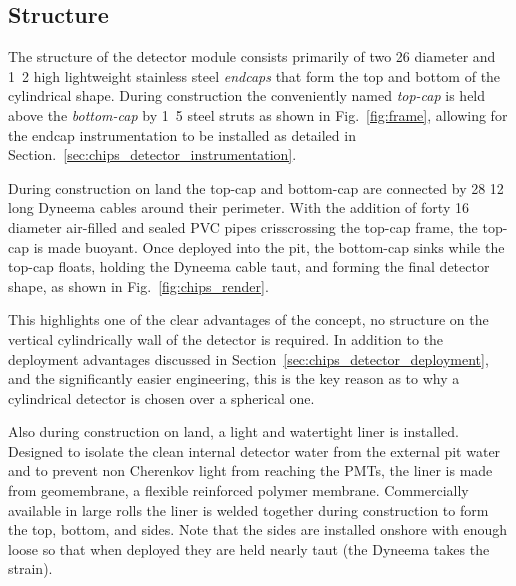 \subsection{Structure} %
\label{sec:chips_detector_structure} %

The structure of the \chipsfive detector module consists primarily of two \unit{26}{}
diameter and \unit{1.2}{} high lightweight stainless steel \emph{endcaps} that form the
top and bottom of the cylindrical shape. During construction the conveniently named \emph{top-cap}
is held above the \emph{bottom-cap} by \unit{1.5}{} steel struts as shown in
Fig.~\ref{fig:frame}, allowing for the endcap instrumentation to be installed as detailed in
Section.~\ref{sec:chips_detector_instrumentation}.

During construction on land the top-cap and bottom-cap are connected by 28 \unit{12}{}
long Dyneema cables around their perimeter. With the addition of forty \unit{16}{}
diameter air-filled and sealed PVC pipes crisscrossing the top-cap frame, the top-cap is made
buoyant. Once deployed into the pit, the bottom-cap sinks while the top-cap floats, holding the
Dyneema cable taut, and forming the final detector shape, as shown in Fig.~\ref{fig:chips_render}.

This highlights one of the clear advantages of the \chips concept, no structure on the vertical
cylindrically wall of the detector is required. In addition to the deployment advantages discussed
in Section~\ref{sec:chips_detector_deployment}, and the significantly easier engineering, this is
the key reason as to why a cylindrical detector is chosen over a spherical one.

Also during construction on land, a light and watertight liner is installed. Designed to isolate
the clean internal detector water from the external pit water and to prevent non Cherenkov light
from reaching the PMTs, the liner is made from geomembrane, a flexible reinforced polymer
membrane. Commercially available in large rolls the liner is welded together during construction
to form the top, bottom, and sides. Note that the sides are installed onshore with enough loose so
that when deployed they are held nearly taut (the Dyneema takes the strain).

